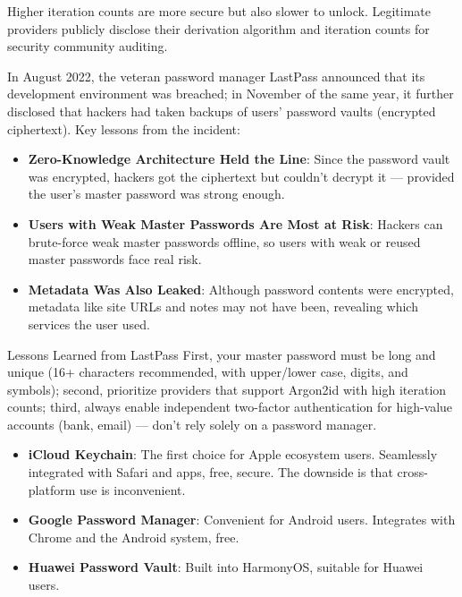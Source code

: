 Higher iteration counts are more secure but also slower to unlock. Legitimate providers publicly disclose their derivation algorithm and iteration counts for security community auditing.


In August 2022, the veteran password manager LastPass announced that its development environment was breached; in November of the same year, it further disclosed that hackers had taken backups of users' password vaults (encrypted ciphertext). Key lessons from the incident:

\begin{itemize}
  \item \textbf{Zero-Knowledge Architecture Held the Line}: Since the password vault was encrypted, hackers got the ciphertext but couldn't decrypt it — provided the user's master password was strong enough.
  \item \textbf{Users with Weak Master Passwords Are Most at Risk}: Hackers can brute-force weak master passwords offline, so users with weak or reused master passwords face real risk.
  \item \textbf{Metadata Was Also Leaked}: Although password contents were encrypted, metadata like site URLs and notes may not have been, revealing which services the user used.
\end{itemize}

\begin{tcbwarn}{Lessons Learned from LastPass}
First, your master password must be long and unique (16+ characters recommended, with upper/lower case, digits, and symbols); second, prioritize providers that support Argon2id with high iteration counts; third, always enable independent two-factor authentication for high-value accounts (bank, email) — don't rely solely on a password manager.

\end{tcbwarn}



\begin{itemize}
  \item \textbf{iCloud Keychain}: The first choice for Apple ecosystem users. Seamlessly integrated with Safari and apps, free, secure. The downside is that cross-platform use is inconvenient.
  \item \textbf{Google Password Manager}: Convenient for Android users. Integrates with Chrome and the Android system, free.
  \item \textbf{Huawei Password Vault}: Built into HarmonyOS, suitable for Huawei users.
\end{itemize}

